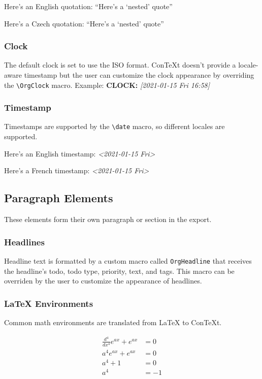 \documentclass[11pt]{article}
\begin{document}
Here's an English quotation: ``Here's a `nested' quote''

Here's a Czech quotation: ``Here's a `nested' quote''

\subsubsection{Clock}
\label{sec:org6c13ab8}
The default clock is set to use the ISO format. ConTeXt doesn't provide
a locale-aware timestamp but the user can customize the clock appearance
by overriding the \texttt{\textbackslash{}OrgClock} macro. Example: 
\noindent\textbf{CLOCK:} \textit{[2021-01-15 Fri 16:58]}\\


\subsubsection{Timestamp}
\label{sec:org5abf201}
Timestamps are supported by the \texttt{\textbackslash{}date} macro, so different locales
are supported.

Here's an English timestamp: \textit{<2021-01-15 Fri>}

Here's a French timestamp: \textit{<2021-01-15 Fri>}

\subsection{Paragraph Elements}
\label{sec:orgef8222f}
These elements form their own paragraph or section in the export.
\subsubsection{Headlines}
\label{sec:org02697ad}
Headline text is formatted by a custom macro called \texttt{OrgHeadline}
that receives the headline's todo, todo type, priority, text, and
tags. This macro can be overriden by the user to customize the
appearance of headlines.
\subsubsection{\LaTeX{} Environments}
\label{sec:org24ef356}
Common math environments are translated from \LaTeX{} to ConTeXt.

\begin{align*}
\frac{d^4}{dx^4} e^{a x} + e^{a x} &= 0 \\
a^4 e^{a x} + e^{a x} &= 0 \\
a^4 + 1 &= 0 \\
a^4 &= -1 \\
\end{align*}
\end{document}
